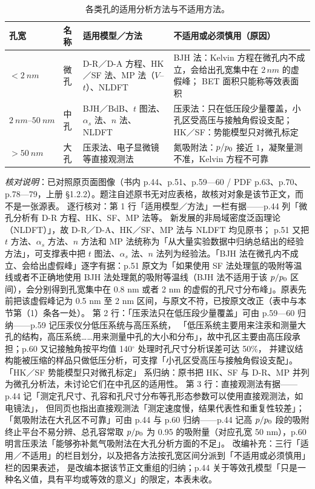\begin{table}[htbp]
\centering
\caption{各类孔的适用分析方法与不适用方法。}
\label{tab:pore-class}
{\srcsize
\begin{tabularx}{\columnwidth}{@{}llXX@{}}
\toprule
孔宽 & 名称 & 适用模型／方法 & 不适用或必须慎用（原因） \\
\midrule
$<\qty{2}{nm}$ & 微孔 &
D-R／D-A 方程、HK／SF 法、MP 法（$V$--$t$）、NLDFT &
BJH 法：Kelvin 方程在微孔内不成立，会给出孔宽集中在 $2\,\unit{nm}$ 的虚假峰；
BET 面积只能称等效表面积 \\
$\qtyrange{2}{50}{nm}$ & 中孔 &
BJH／BdB、$t$ 图法、$\alpha_s$ 法、$n$ 法、NLDFT &
压汞法：只在低压段少量覆盖，小孔区受高压与接触角假设支配；
HK／SF：势能模型只对微孔标定 \\
$>\qty{50}{nm}$ & 大孔 &
压汞法、电子显微镜等直接观测法 &
氮吸附法：$p/p_{0}$ 接近 $1$，凝聚量测不准，Kelvin 方程不可靠 \\
\bottomrule
\end{tabularx}}
\end{table}

\emph{核对说明}：已对照原页面图像（书内 p.44、p.51、p.59—60 / PDF p.63、p.70、
p.78—79，上册 §1.2.2）。题注自述原书无对应表格，故核对对象是该节正文，而不是一张源表。
逐行核对：第 1 行「适用模型／方法」一栏有据——p.44 列「微孔分析有 D-R 方程、HK、SF、MP 法等。
新发展的非局域密度泛函理论（NLDFT）」，故 D-R／D-A、HK／SF、MP 法与 NLDFT 均见原书；
p.51 又把 $t$ 方法、$\alpha_s$ 方法、$n$ 方法和 MP
法统称为「从大量实验数据中归纳总结出的经验方法」，可支撑表中把 $t$ 图法、$\alpha_s$ 法、$n$
法列为经验法。「BJH 法在微孔内不成立、会给出虚假峰」逐字有据：p.51 原文为「如果使用 SF
法处理氩的吸附等温线或者不正确地使用 BJH 法处理氮的吸附等温线（BJH 法不适用于该 $p/p_{0}$ 区间），会分别得到孔宽集中在 0.8 nm 或者 2 nm 的虚假的孔尺寸分布峰」。原表先前把该虚假峰记为 0.5 nm
至 2 nm 区间，与原文不符，已按原文改正（表中与本节第（1）条各一处）。
第 2 行：「压汞法只在低压段少量覆盖」可由 p.59—60 归纳——p.59 记压汞仪分低压系统与高压系统，
「低压系统主要用来注汞和测量大孔的结构，高压系统……用来测量中孔的大小和分布」，故中孔区主要由高压段承担；p.60
又记接触角按平均值 140$^{\circ}$ 处理时孔尺寸分析误差可达 50\%，
并建议结构能被压缩的样品只做低压分析，可支撑「小孔区受高压与接触角假设支配」。「HK／SF 势能模型只对微孔标定」
系归纳：原书把 HK、SF 与 D-R、MP 并列为微孔分析法，未讨论它们在中孔区的适用性。
第 3 行：直接观测法有据——p.44 记「测定孔尺寸、孔容和孔尺寸分布等孔形态参数可以使用直接观测法，如电镜法」，
但同页也指出直接观测法「测定速度慢，结果代表性和重复性较差」；「氮吸附法在大孔区不可靠」可由 p.44 与
p.60 归纳——p.44 记高 $p/p_{0}$ 段的吸附终止平台不易分辨、总孔容常取 $p/p_{0}$ 为
0.95 的吸附量（对应孔宽 50 nm），p.60 明言压汞法「能够弥补氮气吸附法在大孔分析方面的不足」。
改编补充：三行「适用／不适用」的栏目划分，以及把各方法按孔宽区间分派到「不适用或必须慎用」栏的因果表述，
是改编本据该节正文重组的归纳；p.44 关于等效孔模型「只是一种名义值，具有平均或等效的意义」的限定，本表未收。


